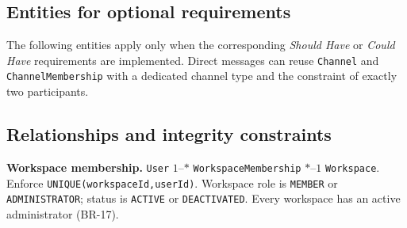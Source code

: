 \documentclass[
    english, %
]{VUMIFPSkursinis}
\begin{document}
\subsection{Entities for optional requirements}
The following entities apply only when the corresponding \textit{Should Have} or \textit{Could Have} requirements are implemented. Direct messages can reuse \texttt{Channel} and \texttt{ChannelMembership} with a dedicated channel type and the constraint of exactly two participants.



\subsection{Relationships and integrity constraints}

\textbf{Workspace membership.} \texttt{User} $1$--$*$ \texttt{WorkspaceMembership} $*$--$1$ \texttt{Workspace}. Enforce \texttt{UNIQUE(workspaceId,userId)}. Workspace role is \texttt{MEMBER} or \texttt{ADMINISTRATOR}; status is \texttt{ACTIVE} or \texttt{DEACTIVATED}. Every workspace has an active administrator (BR-17).
\end{document}
